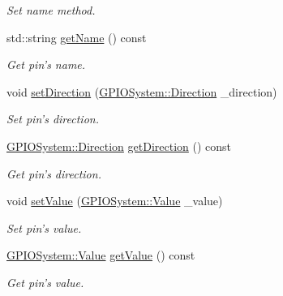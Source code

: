 \begin{DoxyCompactItemize}
\begin{DoxyCompactList}\small\item\em Set name method. \end{DoxyCompactList}\item 
std\-::string \hyperlink{classPin_ad34ebe31aed9ca042513d17e4dfadb1a}{get\-Name} () const 
\begin{DoxyCompactList}\small\item\em Get pin's name. \end{DoxyCompactList}\item 
void \hyperlink{classPin_a4f2fe29e37c959fa7ec90e395bb73230}{set\-Direction} (\hyperlink{classGPIOSystem_ab7ef139a50e1e552a75578b539c7c34d}{G\-P\-I\-O\-System\-::\-Direction} \-\_\-direction)
\begin{DoxyCompactList}\small\item\em Set pin's direction. \end{DoxyCompactList}\item 
\hyperlink{classGPIOSystem_ab7ef139a50e1e552a75578b539c7c34d}{G\-P\-I\-O\-System\-::\-Direction} \hyperlink{classPin_a8ae78028468fec12087c77bee35afe86}{get\-Direction} () const 
\begin{DoxyCompactList}\small\item\em Get pin's direction. \end{DoxyCompactList}\item 
void \hyperlink{classPin_ab8cea89b887392e27a7964e382fffcc5}{set\-Value} (\hyperlink{classGPIOSystem_ace7a93165949f378a8ab04f8809e52f1}{G\-P\-I\-O\-System\-::\-Value} \-\_\-value)
\begin{DoxyCompactList}\small\item\em Set pin's value. \end{DoxyCompactList}\item 
\hyperlink{classGPIOSystem_ace7a93165949f378a8ab04f8809e52f1}{G\-P\-I\-O\-System\-::\-Value} \hyperlink{classPin_ab8584a7f0107f7b7a525a12074d8fbff}{get\-Value} () const 
\begin{DoxyCompactList}\small\item\em Get pin's value. \end{DoxyCompactList}\end{DoxyCompactItemize}
